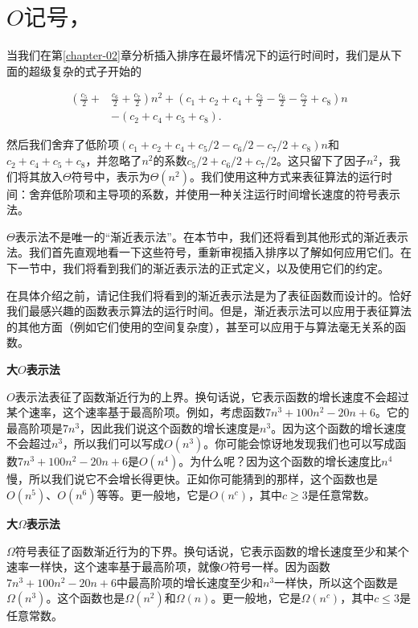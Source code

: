 \documentclass[lang=cn,newtx,10pt,scheme=chinese]{elegantbook}
\begin{document}
\section{\texorpdfstring{$O\text{记号，}$}\texorpdfstring{$\Omega\text{记号和}$}\texorpdfstring{$\Theta\text{记号}$}.}\label{section-3.1}

当我们在第\ref{chapter-02}章分析插入排序在最坏情况下的运行时间时，我们是从下面的超级复杂的式子开始的

\begin{equation*}
\begin{aligned}
\left(\frac{c_5}{2}+\right. & \left.\frac{c_6}{2}+\frac{c_7}{2}\right) n^2+\left(c_1+c_2+c_4+\frac{c_5}{2}-\frac{c_6}{2}-\frac{c_7}{2}+c_8\right) n \\
& -\left(c_2+c_4+c_5+c_8\right) .
\end{aligned}
\end{equation*}

然后我们舍弃了低阶项$\left(c_1+c_2+c_4+c_5 / 2-c_6 / 2-c_7 / 2+c_8\right) n$和$c_2+c_4+c_5+c_8$，并忽略了$n^2$的系数$c_5 / 2+c_6 / 2+c_7 / 2$。这只留下了因子$n^2$，我们将其放入$\Theta$符号中，表示为$\Theta(n^2)$。我们使用这种方式来表征算法的运行时间：舍弃低阶项和主导项的系数，并使用一种关注运行时间增长速度的符号表示法。

$\Theta$表示法不是唯一的``渐近表示法''。在本节中，我们还将看到其他形式的渐近表示法。我们首先直观地看一下这些符号，重新审视插入排序以了解如何应用它们。在下一节中，我们将看到我们的渐近表示法的正式定义，以及使用它们的约定。

在具体介绍之前，请记住我们将看到的渐近表示法是为了表征函数而设计的。恰好我们最感兴趣的函数表示算法的运行时间。但是，渐近表示法可以应用于表征算法的其他方面（例如它们使用的空间复杂度），甚至可以应用于与算法毫无关系的函数。

\textbf{大$O$表示法}

$O$表示法表征了函数渐近行为的上界。换句话说，它表示函数的增长速度不会超过某个速率，这个速率基于最高阶项。例如，考虑函数$7 n^3+100 n^2-20 n+6$。它的最高阶项是$7n^3$，因此我们说这个函数的增长速度是$n^3$。因为这个函数的增长速度不会超过$n^3$，所以我们可以写成$O(n^3)$。你可能会惊讶地发现我们也可以写成函数$7 n^3+100 n^2-20 n+6$是$O(n^4)$。为什么呢？因为这个函数的增长速度比$n^4$慢，所以我们说它不会增长得更快。正如你可能猜到的那样，这个函数也是$O(n^5)$、$O(n^6)$等等。更一般地，它是$O(n^c)$，其中$c \ge 3$是任意常数。

\textbf{大$\Omega$表示法}

$\Omega$符号表征了函数渐近行为的下界。换句话说，它表示函数的增长速度至少和某个速率一样快，这个速率基于最高阶项，就像$O$符号一样。因为函数$7 n^3+100 n^2-20 n+6$中最高阶项的增长速度至少和$n^3$一样快，所以这个函数是$\Omega\left(n^3\right)$。这个函数也是$\Omega\left(n^2\right)$和$\Omega(n)$。更一般地，它是$\Omega\left(n^c\right)$，其中$c \leq 3$是任意常数。
\end{document}
